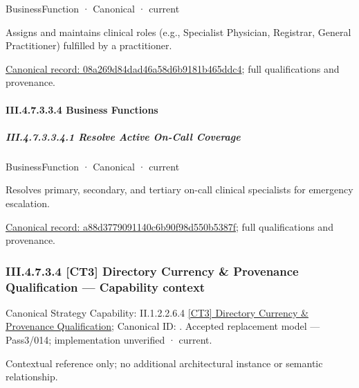 \label{element:08a269d84dad46a58d6b9181b465ddc4}
{\small BusinessFunction · Canonical · current}\par

Assigns and maintains clinical roles (e.g., Specialist Physician, Registrar, General Practitioner) fulfilled by a practitioner.


{\footnotesize \href{../../../../continuum/business/business-function/08a269d84dad46a58d6b9181b465ddc4.md}{Canonical record: 08a269d84dad46a58d6b9181b465ddc4}; full qualifications and provenance.}\par
\paragraph*{III.4.7.3.3.4 Business Functions}
\label{navigation:III.4.7.3.3.4}

\subparagraph*{III.4.7.3.3.4.1 Resolve Active On-Call Coverage}
\label{navigation:III.4.7.3.3.4.1}

\label{element:a88d3779091140c6b90f98d550b5387f}
{\small BusinessFunction · Canonical · current}\par

Resolves primary, secondary, and tertiary on-call clinical specialists for emergency escalation.


{\footnotesize \href{../../../../continuum/business/business-function/a88d3779091140c6b90f98d550b5387f.md}{Canonical record: a88d3779091140c6b90f98d550b5387f}; full qualifications and provenance.}\par
\subsubsection*{III.4.7.3.4 [CT3] Directory Currency \& Provenance Qualification — Capability context}
\label{navigation:III.4.7.3.4}

{\small Canonical Strategy Capability: II.1.2.2.6.4 \hyperref[element:21e0c3d5b39b4d6c9c082241150f1f09]{[CT3] Directory Currency \& Provenance Qualification}; Canonical ID: \texttt{}. Accepted replacement model — Pass3/014; implementation unverified · current.}\par
Contextual reference only; no additional architectural instance or semantic relationship.\par
